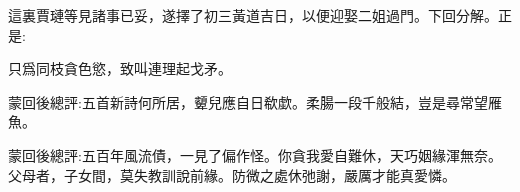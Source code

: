 \begin{parag}
    這裏賈璉等見諸事已妥，遂擇了初三黃道吉日，以便迎娶二姐過門。下回分解。正是:
\end{parag}


\begin{poem}
    \begin{pl}只爲同枝貪色慾，致叫連理起戈矛。\end{pl}

\end{poem}



\begin{parag}
    \begin{note}蒙回後總評:五首新詩何所居，顰兒應自日欷歔。柔腸一段千般結，豈是尋常望雁魚。\end{note}
\end{parag}


\begin{parag}
    \begin{note}蒙回後總評:五百年風流債，一見了偏作怪。你貪我愛自難休，天巧姻緣渾無奈。父母者，子女間，莫失教訓說前緣。防微之處休弛謝，嚴厲才能真愛憐。\end{note}
\end{parag}